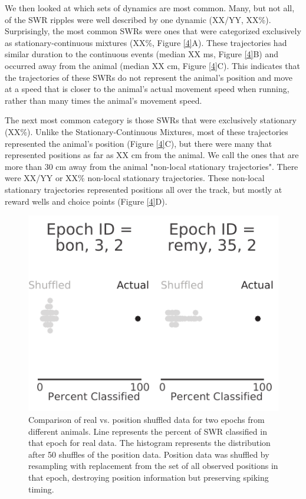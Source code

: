 \documentclass[times, twoside]{zHenriquesLab-StyleBioRxiv}
\begin{document}
We then looked at which sets of dynamics are most common. Many, but not all, of the SWR ripples were well described by one dynamic (XX/YY, XX\%). Surprisingly, the most common SWRs were ones that were categorized exclusively as stationary-continuous mixtures (XX\%, Figure \ref{4}A). These trajectories had similar duration to the continuous events (median XX ms, Figure \ref{4}B) and occurred away from the animal (median XX cm, Figure \ref{4}C). This indicates that the trajectories of these SWRs do not represent the animal's position and move at a speed that is closer to the animal's actual movement speed when running, rather than many times the animal's movement speed.

The next most common category is those SWRs that were exclusively stationary (XX\%). Unlike the Stationary-Continuous Mixtures, most of these trajectories represented the animal's position (Figure \ref{4}C), but there were many that represented positions as far as XX cm from the animal. We call the ones that are more than 30 cm away from the animal "non-local stationary trajectories". There were XX/YY or XX\% non-local stationary trajectories. These non-local stationary trajectories represented positions all over the track, but mostly at reward wells and choice points (Figure \ref{4}D). 

\begin{figure}%
\centering
\includegraphics[width=0.80\linewidth]{figures/Figure5/Figure5_v1}
\caption{Comparison of real vs. position shuffled data for two epochs from different animals. Line represents the percent of SWR classified in that epoch for real data. The histogram represents the distribution after 50 shuffles of the position data. Position data was shuffled by resampling with replacement from the set of all observed positions in that epoch, destroying position information but preserving spiking timing.}
\label{Figure5}
\end{figure}
\end{document}
